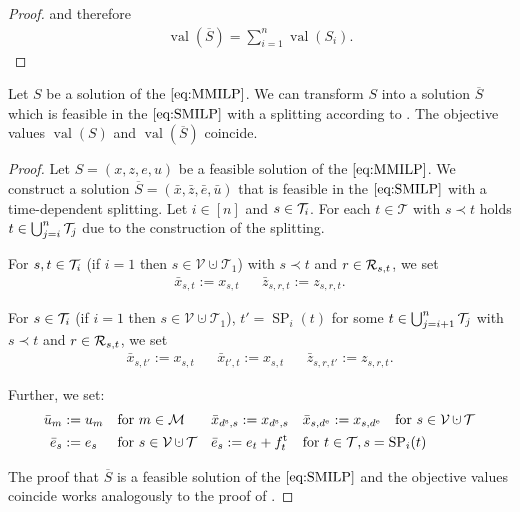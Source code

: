 \begin{proof}
and therefore
\begin{align*}
	\operatorname{val}\left(\overline{S}\right) = \sum_{i=1}^n \operatorname{val}\left(S_i\right).
\end{align*}
%
\end{proof}

\begin{lemma}
\label{lem:equivalence_MMILP_SMILP}

Let $S$ be a solution of the $\eqref{eq:MMILP}$. We can transform $S$ into a solution $\overline{S}$ which is feasible in the $\eqref{eq:SMILP}$ with a splitting according to . The objective values $\operatorname{val}(S)$ and $\operatorname{val}(\overline{S})$ coincide.

\end{lemma}

\begin{proof}

Let ${S=\left(x,z,e,u\right)}$ be a feasible solution of the $\eqref{eq:MMILP}$. We construct a solution ${\overline{S}=\left(\bar{x},\bar{z},\bar{e},\bar{u}\right)}$ that is feasible in the $\eqref{eq:SMILP}$ with a time-dependent splitting. Let $i\in[n]$ and ${s\in\mathcal{T}_i}$. For each ${t\in\mathcal{T}}$ with ${s\prec t}$ holds ${t\in\bigcup_{j=i}^n\mathcal{T}_j}$ due to the construction of the splitting.

For ${s,t\in\mathcal{T}_i}$ (if $i=1$ then $s\in\mathcal{V}\cupdot\mathcal{T}_1$) with ${s\prec t}$ and ${r\in\mathcal{R}_{s,t}}$, we set
\begin{align*}
	\bar{x}_{s,t} := x_{s,t} && \bar{z}_{s,r,t} := z_{s,r,t}.
\end{align*}

For ${s\in\mathcal{T}_i}$ (if $i=1$ then $s\in\mathcal{V}\cupdot\mathcal{T}_1$), ${t'=\operatorname{SP}_i(t)}$ for some ${t\in\bigcup_{j=i+1}^n\mathcal{T}_j}$ with ${s\prec t}$ and ${r\in\mathcal{R}_{s,t}}$, we set
\begin{align*}
	\bar{x}_{s,t'} := x_{s,t} && \bar{x}_{t',t} := x_{s,t} && \bar{z}_{s,r,t'} := z_{s,r,t}.
\end{align*}

Further, we set:
\begin{align*}
	\bar{u}_m & := u_m && \text{for } m\in\mathcal{M} && \bar{x}_{\ds,s} := x_{\ds,s} && \bar{x}_{s,\de} := x_{s,\de} && \text{for } s\in\mathcal{V}\cupdot\mathcal{T} \\
	\bar{e}_s & := e_s && \text{for } s\in\mathcal{V}\cupdot\mathcal{T} && \bar{e}_s := e_t + \ft_t && \omit\rlap{for $t\in\mathcal{T}, s=\operatorname{SP}_i(t)$}
\end{align*}

The proof that $\overline{S}$ is a feasible solution of the $\eqref{eq:SMILP}$ and the objective values coincide works analogously to the proof of .
%
\end{proof}

